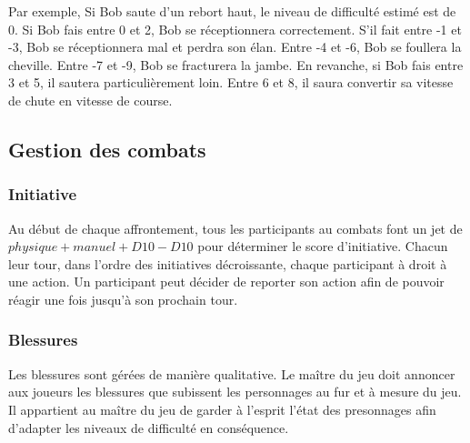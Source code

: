 \documentclass[oneside,12pt]{article}
\begin{document}
Par exemple, Si Bob saute d'un rebort haut, le niveau de difficult\'e estim\'e est de 0.
Si Bob fais entre 0 et 2, Bob se r\'eceptionnera correctement.
S'il fait entre -1 et -3, Bob se r\'eceptionnera mal et perdra son élan.
Entre -4 et -6, Bob se foullera la cheville.
Entre -7 et -9, Bob se fracturera la jambe.
En revanche, si Bob fais entre 3 et 5, il sautera particulièrement loin.
Entre 6 et 8, il saura convertir sa vitesse de chute en vitesse de course.
\subsection{Gestion des combats}
\subsubsection{Initiative}
Au d\'ebut de chaque affrontement, tous les participants au combats font un jet de $ physique + manuel + D10 - D10 $ pour d\'eterminer le score d'initiative.
Chacun leur tour, dans l'ordre des initiatives d\'ecroissante, chaque participant \`a droit \`a une action.
Un participant peut d\'ecider de reporter son action afin de pouvoir r\'eagir une fois jusqu'\`a son prochain tour.
\subsubsection{Blessures}
Les blessures sont g\'er\'ees de mani\`ere qualitative.
Le ma\^itre du jeu doit annoncer aux joueurs les blessures que subissent les personnages au fur et \`a mesure du jeu.
Il appartient au ma\^itre du jeu de garder \`a l'esprit l'\'etat des presonnages afin d'adapter les niveaux de difficult\'e en cons\'equence.
\end{document}
